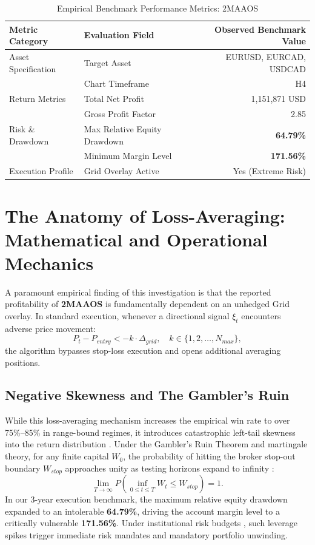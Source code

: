 \documentclass[11pt,a4paper]{article}
\begin{document}
\begin{table}[H]
\centering
\caption{Empirical Benchmark Performance Metrics: 2MAAOS}
\label{tab:metrics}
\begin{tabular}{llr}
\toprule
\textbf{Metric Category} & \textbf{Evaluation Field} & \textbf{Observed Benchmark Value} \\
\midrule
Asset Specification & Target Asset & EURUSD, EURCAD, USDCAD \\
& Chart Timeframe & H4 \\
Return Metrics & Total Net Profit & 1,151,871 USD \\
& Gross Profit Factor & 2.85 \\
Risk \& Drawdown & Max Relative Equity Drawdown & \textbf{64.79\%} \\
& Minimum Margin Level & \textbf{171.56\%} \\
Execution Profile & Grid Overlay Active & Yes (Extreme Risk) \\
\bottomrule
\end{tabular}
\end{table}


\section{The Anatomy of Loss-Averaging: Mathematical and Operational Mechanics}
A paramount empirical finding of this investigation is that the reported profitability of \textbf{2MAAOS} is fundamentally dependent on an unhedged Grid overlay. In standard execution, whenever a directional signal $\xi_t$ encounters adverse price movement:
\begin{equation}
P_t - P_{entry} < -k \cdot \Delta_{grid}, \quad k \in \{1, 2, \dots, N_{max}\},
\end{equation}
the algorithm bypasses stop-loss execution and opens additional averaging positions. 

\subsection{Negative Skewness and The Gambler's Ruin}
While this loss-averaging mechanism increases the empirical win rate to over 75\%--85\% in range-bound regimes, it introduces catastrophic left-tail skewness into the return distribution \cite{bouchaud2003theory, cont2001empirical}. Under the Gambler's Ruin Theorem and martingale theory, for any finite capital $W_0$, the probability of hitting the broker stop-out boundary $W_{stop}$ approaches unity as testing horizons expand to infinity \cite{bouchaud2009markets}:
\begin{equation}
\lim_{T \to \infty} P\left(\inf_{0 \le t \le T} W_t \le W_{stop}\right) = 1.
\end{equation}
In our 3-year execution benchmark, the maximum relative equity drawdown expanded to an intolerable \textbf{64.79\%}, driving the account margin level to a critically vulnerable \textbf{171.56\%}. Under institutional risk budgets \cite{rockafellar2000optimization, shleifer1997limits}, such leverage spikes trigger immediate risk mandates and mandatory portfolio unwinding.
\end{document}
